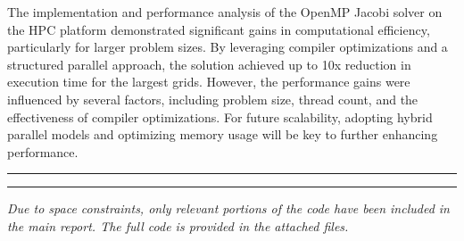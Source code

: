 \documentclass{article}
\begin{document}
The implementation and performance analysis of the OpenMP Jacobi solver on the HPC platform demonstrated significant gains in computational efficiency, particularly for larger problem sizes. By leveraging compiler optimizations and a structured parallel approach, the solution achieved up to 10x reduction in execution time for the largest grids. However, the performance gains were influenced by several factors, including problem size, thread count, and the effectiveness of compiler optimizations. For future scalability, adopting hybrid parallel models and optimizing memory usage will be key to further enhancing performance.

\rule{\linewidth}{0.5pt}

\printbibliography

\hrule

\textit{Due to space constraints, only relevant portions of the code have been included in the main report. The full code is provided in the attached files.}
\end{document}
